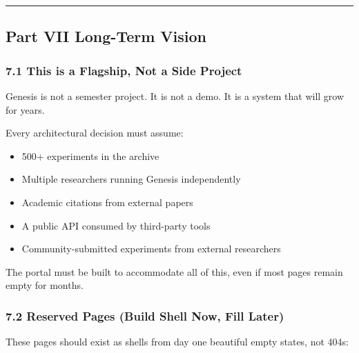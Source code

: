 \documentclass[11pt,a4paper]{article}
\begin{document}
\noindent\rule{\textwidth}{0.4pt}

\subsection*{Part VII  Long-Term Vision}

\subsubsection*{7.1 This is a Flagship, Not a Side Project}

Genesis is not a semester project. It is not a demo. It is a system that will grow for years.

Every architectural decision must assume:
\begin{itemize}
  \item 500+ experiments in the archive
  \item Multiple researchers running Genesis independently
  \item Academic citations from external papers
  \item A public API consumed by third-party tools
  \item Community-submitted experiments from external researchers
\end{itemize}

The portal must be built to accommodate all of this, even if most pages remain empty for months.

\subsubsection*{7.2 Reserved Pages (Build Shell Now, Fill Later)}

These pages should exist as shells from day one  beautiful empty states, not 404s:
\end{document}
